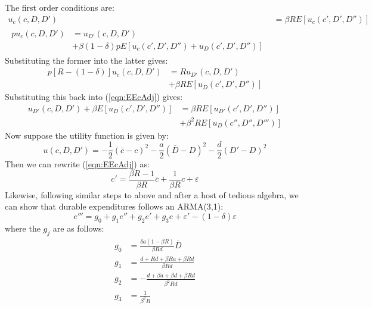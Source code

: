 \documentclass[12pt]{article}
\begin{document}
The first order conditions are:
%
\begin{align}
 u_c(c, D, D') &= \beta R E \left[u_c(c', D', D'')\right] \label{eqn:EEcAdj} \\
 \begin{split} 
 p u_c(c, D, D') &= u_{D'}(c, D, D') \\
 &+ \beta (1 - \delta) p E \left[u_c(c', D', D'') + u_D(c', D', D'')\right]
 \end{split}
\end{align}
%
Substituting the former into the latter gives:
%
\begin{equation}
 \begin{split} 
	p[R - (1 - \delta)] u_c(c, D, D') &= R u_{D'}(c, D, D') \\
	&+ \beta R E \left[u_D(c', D', D'')\right]
 \end{split}
\end{equation}
%
Substituting this back into (\ref{eqn:EEcAdj}) gives:
%
\begin{equation}
 \begin{split} 
	u_{D'}(c, D, D') + \beta E \left[u_D(c', D', D'')\right] &= \beta R E \left[ u_{D'}(c', D', D'')\right] \\
	&+ \beta^2 R E \left[u_D(c'', D'', D''')\right]
 \end{split}
\end{equation}
%
Now suppose the utility function is given by:
%
\begin{equation}
 u(c, D, D') = -\frac{1}{2}(\overline{c} - c)^2 - \frac{a}{2}(\overline{D} - D)^2  - \frac{d}{2}(D' - D)^2
\end{equation}
%
Then we can rewrite (\ref{eqn:EEcAdj}) as:
%
\begin{equation}
	c' = \frac{\beta R - 1}{\beta R}\overline{c} + \frac{1}{\beta R}c + \varepsilon
\end{equation}
%
Likewise, following similar steps to above and after a host of tedious algebra, we can show that durable expenditures follows an ARMA(3,1):
%
\begin{equation}
	e''' = g_0 + g_1 e'' + g_2 e' + g_3 e + \varepsilon' - (1 - \delta) \varepsilon
\end{equation}
%
where the \(g_j\) are as follows:
%
\begin{align}
	g_0 &= \frac{\delta a(1 - \beta R)}{\beta R d} \overline{D} \\
	g_1 &= \frac{d + Rd + \beta Ra + \beta Rd}{\beta Rd} \\
	g_2 &= - \frac{d + \beta a + \beta d + \beta Rd}{\beta^2 R d} \\
	g_3 &= \frac{1}{\beta^2 R}
\end{align}
%



\end{document}
